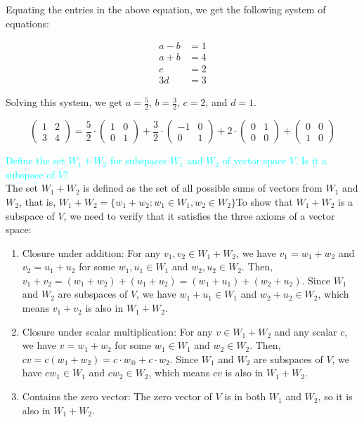 \documentclass[fontsize=12pt]{scrartcl}
\begin{document}
Equating the entries in the above equation, we get the following system of equations:

\begin{align*}
a - b &= 1\\
a + b &= 4\\
c &= 2\\
3d &= 3
\end{align*}

Solving this system, we get $a=\frac{5}{2}$, $b=\frac{3}{2}$, $c=2$, and $d=1$.

$$\left( \begin{array}{cc} 1 & 2\\ 3 & 4\end{array}\right) = \frac{5}{2} \cdot \left( \begin{array}{cc} 1 & 0\\ 0 & 1\end{array}\right) + \frac{3}{2}\cdot \left( \begin{array}{cc} -1 & 0\\ 0 & 1\end{array}\right) + 2\cdot \left( \begin{array}{cc} 0 & 1\\ 0 & 0\end{array}\right) + \left( \begin{array}{cc} 0 & 0\\ 1 & 0\end{array}\right)$$

\newpage

\noindent
\textcolor{cyan}{Define the set $W_1 + W_2$ for subspaces $W_1$ and $W_2$ of vector space $V$. Is it a subspace of $V$?}\\
\noindent
The set $W_1 + W_2$ is defined as the set of all possible sums of vectors from $W_1$ and $W_2$, that is, $W_1 + W_2 = \{w_1+w_2: w_1\in W_1, w_2\in W_2\}$To show that $W_1 + W_2$ is a subspace of $V$, we need to verify that it satisfies the three axioms of a vector space:

\begin{enumerate}
	\item Closure under addition: For any $v_1,v_2 \in W_1 + W_2$, we have $v_1 = w_1 + w_2$ and $v_2 = u_1 + u_2$ for some $w_1, u_1 \in W_1$ and $w_2, u_2 \in W_2$. Then, $v_1 + v_2 = (w_1 + w_2) + (u_1 + u_2) = (w_1 + u_1) + (w_2 + u_2).$ Since $W_1$ and $W_2$ are subspaces of $V$, we have $w_1 + u_1 \in W_1$ and $w_2 + u_2 \in W_2$, which means $v_1 + v_2$ is also in $W_1 + W_2$.
	\item Closure under scalar multiplication: For any $v \in W_1 + W_2$ and any scalar $c$, we have $v = w_1 + w_2$ for some $w_1 \in W_1$ and $w_2 \in W_2$. Then, $cv = c(w_1 + w_2) = c\cdot w_@ + c\cdot w_2$. Since $W_1$ and $W_2$ are subspaces of $V$, we have $cw_1 \in W_1$ and $cw_2 \in W_2$, which means $cv$ is also in $W_1 + W_2$.
	\item Contains the zero vector: The zero vector of $V$ is in both $W_1$ and $W_2$, so it is also in $W_1 + W_2$.
\end{enumerate}
\end{document}
